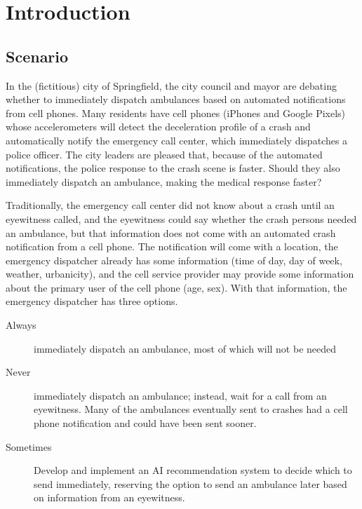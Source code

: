 \section{Introduction}
\label{intro}

\subsection{Scenario}
\label{intro_scenario}

In the (fictitious) city of Springfield, the city council and mayor are debating whether to immediately dispatch ambulances based on automated notifications from cell phones.  Many residents have cell phones (iPhones and Google Pixels) whose accelerometers will detect the deceleration profile of a crash and automatically notify the emergency call center, which immediately dispatches a police officer.  The city leaders are pleased that, because of the automated notifications, the police response to the crash scene is faster.  Should they also immediately dispatch an ambulance, making the medical response faster?

Traditionally, the emergency call center did not know about a crash until an eyewitness called, and the eyewitness could say whether the crash persons needed an ambulance, but that information does not come with an automated crash notification from a cell phone. The notification will come with a location, the emergency dispatcher already has some information (time of day, day of week, weather, urbanicity), and the cell service provider may provide some information about the primary user of the cell phone (age, sex).  With that information, the emergency dispatcher has three options.

\begin{description}
	\item [Always] immediately dispatch an ambulance, most of which will not be needed
	\item [Never] immediately dispatch an ambulance; instead, wait for a call from an eyewitness.  Many of the ambulances eventually sent to crashes had a cell phone notification and could have been sent sooner.  
	\item [Sometimes]  Develop and implement an AI recommendation system to decide which to send immediately, reserving the option to send an ambulance later based on information from an eyewitness.  
\end{description}


